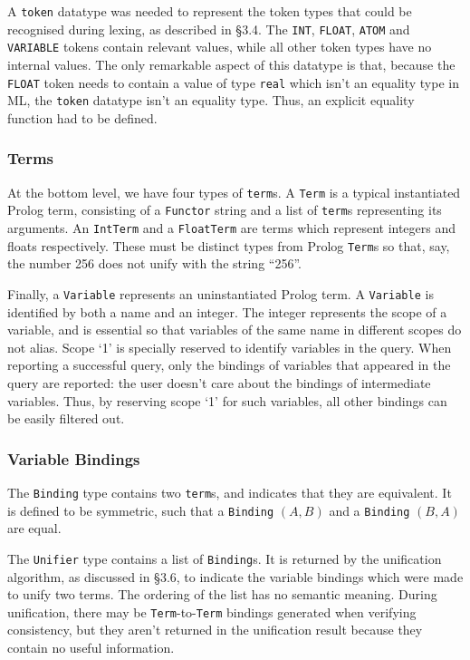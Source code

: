 \documentclass[12pt]{article}
\begin{document}
A \verb|token| datatype was needed to represent the token types that could be recognised during lexing, as described in \S3.4. 
The \verb|INT|, \verb|FLOAT|, \verb|ATOM| and \verb|VARIABLE| tokens contain relevant values, while all other token types have no internal values. 
The only remarkable aspect of this datatype is that, because the \verb|FLOAT| token needs to contain a value of type \verb|real| which isn't an equality type in ML, the \verb|token| datatype isn't an equality type. 
Thus, an explicit equality function had to be defined.

\subsubsection{Terms}

At the bottom level, we have four types of \verb|term|s. A \verb|Term| is a typical instantiated Prolog term, consisting of a \verb|Functor| string and a list of \verb|term|s representing its arguments. 
An \verb|IntTerm| and a \verb|FloatTerm| are terms which represent integers and floats respectively. 
These must be distinct types from Prolog \verb|Term|s so that, say, the number 256 does not unify with the string ``256''. 

Finally, a \verb|Variable| represents an uninstantiated Prolog term. 
A \verb|Variable| is identified by both a name and an integer. 
The integer represents the scope of a variable, and is essential so that variables of the same name in different scopes do not alias. 
Scope `1' is specially reserved to identify variables in the query. 
When reporting a successful query, only the bindings of variables that appeared in the query are reported: the user doesn't care about the bindings of intermediate variables.
Thus, by reserving scope `1' for such variables, all other bindings can be easily filtered out.

\subsubsection{Variable Bindings}

The \verb|Binding| type contains two \verb|term|s, and indicates that they are equivalent. 
It is defined to be symmetric, such that a \verb|Binding| $(A,B)$ and a \verb|Binding| $(B,A)$ are equal.

The \verb|Unifier| type contains a list of \verb|Binding|s. 
It is returned by the unification algorithm, as discussed in \S3.6, to indicate the variable bindings which were made to unify two terms. 
The ordering of the list has no semantic meaning.
During unification, there may be \verb|Term|-to-\verb|Term| bindings generated when verifying consistency, but they aren't returned in the unification result because they contain no useful information.
\end{document}
